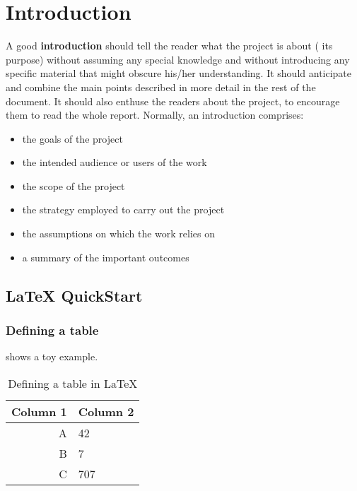 
\chapter{Introduction}\label{ch:introduction}

A good \textbf{introduction} should tell the reader what the project is about (\ie{} its purpose) without assuming any special knowledge and without introducing any specific material that might obscure his/her understanding. It should anticipate and combine the main points described in more detail in the rest of the document. It should also enthuse the readers about the project, to encourage them to read the whole report. Normally, an introduction comprises:

\begin{itemize}
	\item the goals of the project
	\item the intended audience or users of the work
	\item the scope of the project
	\item the strategy employed to carry out the project
	\item the assumptions on which the work relies on
	\item a summary of the important outcomes
\end{itemize}

\section{\LaTeX{} QuickStart}

\subsection{Defining a table}

 shows a toy example.

\begin{table}
  \centering 
  \caption{Defining a table in \LaTeX{}}\label{tb:example} 
  \begin{tabular}{rl}    
	\toprule
	\textbf{Column 1} & \textbf{Column 2} \\ 
	\midrule
	   A & 42\\
	   B & 7\\
	   C & 707\\
	\bottomrule
  \end{tabular}
\end{table}


